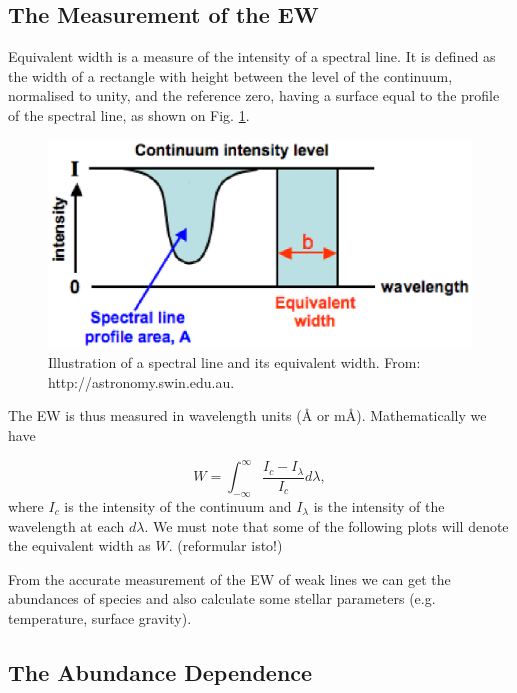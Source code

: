 \documentclass[dvips,12pt,a4paper]{report}
\begin{document}
{\subsection{The Measurement of the EW}

Equivalent width is a measure of the intensity of a spectral line. It is defined as the width of a rectangle with height between the level of the continuum, normalised to unity, and the reference zero, having a surface equal to the profile of the spectral line, as shown on Fig. \ref{ew}. 

\begin{figure}[h]
\centering
\includegraphics[height=5 cm]{pics/equivalent_width}
\caption{Illustration of a spectral line and its equivalent width. From: http://astronomy.swin.edu.au.}
\label{ew}
\end{figure}

The EW is thus measured in wavelength units (\AA{}  or m\AA). Mathematically we have

\begin{equation}
 W=\int_{-\infty}^{\infty} \frac{I_c-I_\lambda}{I_c}d\lambda,
\end{equation}
where $I_c$ is the intensity of the continuum and $I_\lambda$ is the intensity of the wavelength at each $d\lambda$. We must note that some of the following plots will denote the equivalent width as $W$. (reformular isto!)

From the accurate measurement of the EW of weak lines we can get the abundances of species and also calculate some stellar parameters (e.g. temperature, surface gravity).

\subsection{The Abundance Dependence}
\label{abdep}

}
\end{document}
